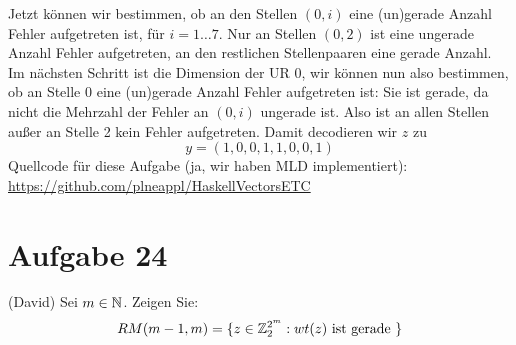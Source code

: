 Jetzt können wir bestimmen, ob an den Stellen $(0, i)$ eine (un)gerade Anzahl Fehler aufgetreten ist, für $i=1\ldots 7$. Nur an Stellen $(0, 2)$ ist eine ungerade Anzahl Fehler aufgetreten, an den restlichen Stellenpaaren eine gerade Anzahl.\\
Im nächsten Schritt ist die Dimension der UR 0, wir können nun also bestimmen, ob an Stelle 0 eine (un)gerade Anzahl Fehler aufgetreten ist: Sie ist gerade, da nicht die Mehrzahl der Fehler an $(0, i)$ ungerade ist. Also ist an allen Stellen außer an Stelle 2 kein Fehler aufgetreten. Damit decodieren wir $z$ zu $$y = (1, 0, 0, 1, 1, 0, 0, 1)$$
Quellcode für diese Aufgabe (ja, wir haben MLD implementiert): \url{https://github.com/plneappl/HaskellVectorsETC}

\section*{Aufgabe 24}
(David)
Sei $m \in \mathbb{N}$. Zeigen Sie:
\begin{equation*}
	RM(m-1,m) = \lbrace z \in \mathbb{Z}^{2^m}_2 : wt(z) \text{ ist gerade } \rbrace
\end{equation*}

